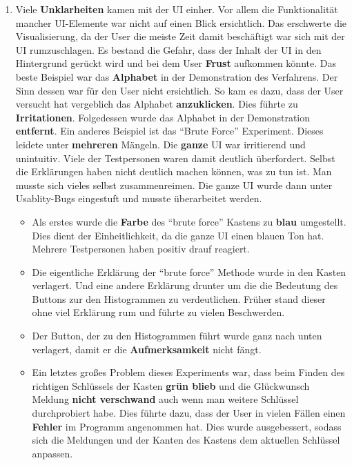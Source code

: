\documentclass{article}
\begin{document}
\begin{enumerate}
      \item Viele \textbf{Unklarheiten} kamen mit der UI einher. Vor allem die Funktionalität mancher UI-Elemente war nicht auf einen Blick ersichtlich.
            Das erschwerte die Visualisierung, da der User die meiste Zeit damit beschäftigt war sich mit der UI rumzuschlagen. Es bestand die Gefahr, dass
            der Inhalt der UI in den Hintergrund gerückt wird und bei dem User \textbf{Frust} aufkommen könnte.\newline
            Das beste Beispiel war das \textbf{Alphabet} in der Demonstration des Verfahrens. Der Sinn dessen war für den User nicht ersichtlich.
            So kam es dazu, dass der User versucht hat vergeblich das Alphabet \textbf{anzuklicken}. Dies führte zu \textbf{Irritationen}. Folgedessen wurde das Alphabet 
            in der Demonstration \textbf{entfernt}.\newline
            Ein anderes Beispiel ist das ``Brute Force'' Experiment. Dieses leidete unter \textbf{mehreren} Mängeln. Die \textbf{ganze} UI war irritierend und unintuitiv.
            Viele der Testpersonen waren damit deutlich überfordert. Selbst die Erklärungen haben nicht deutlich machen können, was zu tun ist. 
            Man musste sich vieles selbst zusammenreimen. Die ganze UI wurde dann unter Usablity-Bugs eingestuft und musste überarbeitet werden.
            \begin{itemize}
             \item Als erstes wurde die \textbf{Farbe} des ``brute force'' Kastens zu \textbf{blau} umgestellt. Dies dient der Einheitlichkeit, da die ganze UI einen blauen 
                   Ton hat. Mehrere Testpersonen haben positiv drauf reagiert.
             
             \item Die eigentliche Erklärung der ``brute force'' Methode wurde in den Kasten verlagert. Und eine andere Erklärung drunter um die die Bedeutung
                   des Buttons zur den Histogrammen zu verdeutlichen. Früher stand dieser ohne viel Erklärung rum und führte zu vielen Beschwerden.
                   
             \item Der Button, der zu den Histogrammen führt wurde ganz nach unten verlagert, damit er die \textbf{Aufmerksamkeit} nicht fängt.
% 
             \item Ein letztes großes Problem dieses Experiments war, dass beim Finden des richtigen Schlüssels der Kasten \textbf{grün blieb} und die Glückwunsch Meldung
                   \textbf{nicht verschwand} auch wenn man weitere Schlüssel durchprobiert habe. Dies führte dazu, dass der User in vielen Fällen einen \textbf{Fehler} im Programm
                   angenommen hat. Dies wurde ausgebessert, sodass sich die Meldungen und der Kanten des Kastens dem aktuellen Schlüssel anpassen.
            \end{itemize}
     \end{enumerate}
\end{document}
